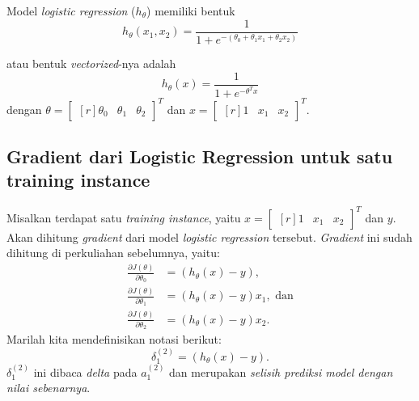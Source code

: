 \documentclass[12pt]{article}
\begin{document}
Model \textit{logistic regression} ($h_\theta$) memiliki bentuk
\begin{equation}
	h_\theta(x_1, x_2) = \frac{1}{1+e^{-(\theta_0 + \theta_1 x_1 + \theta_2 x_2)}}
\end{equation}

atau bentuk \textit{vectorized}-nya adalah
\begin{equation}
	h_\theta(x) = \frac{1}{1+e^{-\theta^T x}}
\end{equation}
dengan $\theta = \begin{bmatrix}[r]
	\theta_0 & \theta_1 & \theta_2
\end{bmatrix}^T$ dan $x = \begin{bmatrix}[r]
	1 & x_1 & x_2
\end{bmatrix}^T$.

\subsection*{Gradient dari Logistic Regression untuk satu training instance}
Misalkan terdapat satu \textit{training instance}, yaitu $x = \begin{bmatrix}[r]
	1 & x_1 & x_2
\end{bmatrix}^T$ dan $y$. Akan dihitung \textit{gradient} dari model \textit{logistic regression} tersebut. \textit{Gradient} ini sudah dihitung di perkuliahan sebelumnya, yaitu:
\begin{align}
	\frac{\partial J(\theta)}{\partial \theta_0} &= (h_\theta(x) - y), \label{eq:gradient-lr-1} \\
	\frac{\partial J(\theta)}{\partial \theta_1} &= (h_\theta(x) - y) x_1, \text{ dan} \label{eq:gradient-lr-2} \\	
	\frac{\partial J(\theta)}{\partial \theta_2} &= (h_\theta(x) - y) x_2. \label{eq:gradient-lr-3}	
\end{align}
Marilah kita mendefinisikan notasi berikut:
\begin{equation}
	\delta^{(2)}_1 = (h_\theta(x) - y).
	\label{eq:delta-one-instance}
\end{equation}
$\delta^{(2)}_1$ ini dibaca \textit{delta} pada $a_1^{(2)}$ dan merupakan \textit{selisih prediksi model dengan nilai sebenarnya}.
 
\end{document}
